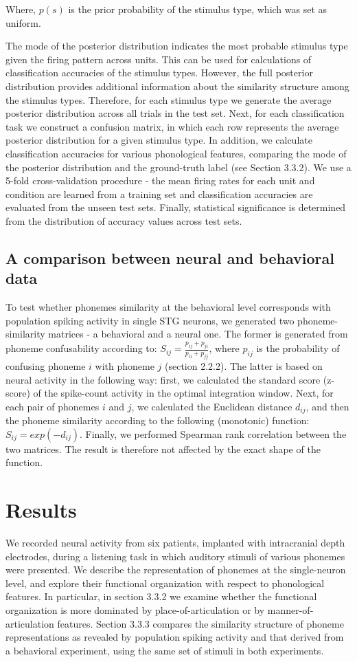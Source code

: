 Where, $p(s)$ is the prior probability of the stimulus type, which was set as uniform.

The mode of the posterior distribution indicates the most probable stimulus type given the firing pattern across units. This can be used for calculations of classification accuracies of the stimulus types. However, the full posterior distribution provides additional information about the similarity structure among the stimulus types. Therefore, for each stimulus type we generate the average posterior distribution across all trials in the test set. Next, for each classification task we construct a confusion matrix, in which each row represents the average posterior distribution for a given stimulus type. In addition, we calculate classification accuracies for various phonological features, comparing the mode of the posterior distribution and the ground-truth label (see Section 3.3.2). We use a 5-fold cross-validation procedure - the mean firing rates for each unit and condition are learned from a training set and classification accuracies are evaluated from the unseen test sets. Finally, statistical significance is determined from the distribution of accuracy values across test sets.


\subsection{A comparison between neural and behavioral data}
To test whether phonemes similarity at the behavioral level corresponds with population spiking activity in single STG neurons, we generated two phoneme-similarity matrices - a behavioral and a neural one. The former is generated from phoneme confusability according to: $S_{ij}=\frac{p_{ij}+p_{ji}}{p_{ii}+p_{jj}}$, where $p_{ij}$ is the probability of confusing phoneme $i$ with phoneme $j$ (section 2.2.2). The latter is based on neural activity in the following way: first, we calculated the standard score (z-score) of the spike-count activity in the optimal integration window. Next, for each pair of phonemes $i$ and $j$, we calculated the Euclidean distance $d_{ij}$, and then the phoneme similarity according to the following (monotonic) function: $S_{ij}=exp(-d_{ij})$. Finally, we performed Spearman rank correlation between the two matrices. The result is therefore not affected by the exact shape of the function. 

\section{Results}
We recorded neural activity from six patients, implanted with intracranial depth electrodes, during a listening task in which auditory stimuli of various phonemes were presented. We describe the representation of phonemes at the single-neuron level, and explore their functional organization with respect to phonological features. In particular, in section 3.3.2 we examine whether the functional organization is more dominated by place-of-articulation or by manner-of-articulation features. Section 3.3.3 compares the similarity structure of phoneme representations as revealed by population spiking activity and that derived from a behavioral experiment, using the same set of stimuli in both experiments.


